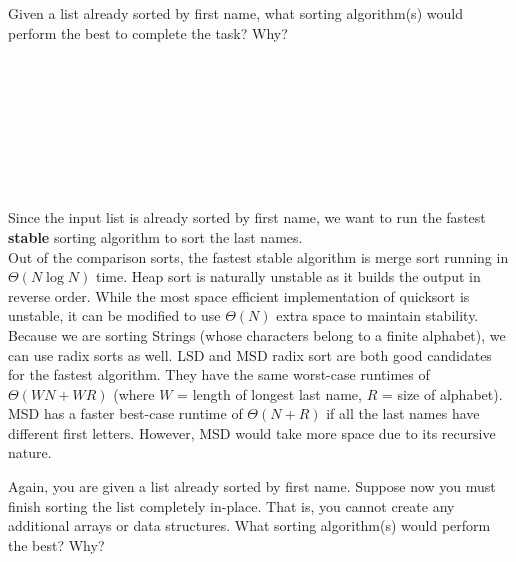 \begin{parts}
\item Given a list already sorted by first name, what sorting algorithm(s)
would perform the best to complete the task? Why? 

\ifprintanswers\else
\hspace \\ \\ \\ \\ \\ \\ \\
\fi 

\begin{solution}
Since the input list is already sorted by first name, we want to run the
fastest \textbf{stable} sorting algorithm to sort the last names.
\\
Out of the comparison sorts, the fastest stable algorithm is merge sort
running in $\Theta(N \log N)$ time. Heap sort is naturally unstable as it builds the output in reverse order. While the most space efficient implementation of quicksort is unstable, it can be modified to use $\Theta(N)$ extra space to maintain stability.
\\
Because we are sorting Strings (whose characters belong to a finite
alphabet), we can use radix sorts as well. LSD and MSD radix sort are
both good candidates for the fastest algorithm. They have the same
worst-case runtimes of $\Theta(W N + W R)$ (where $W$ = length of longest
last name, $R$ = size of alphabet). MSD has a faster best-case runtime
of $\Theta(N + R)$ if all the last names have different first letters. However,
MSD would take more space due to its recursive nature.
\end{solution}

\item Again, you are given a list already sorted by first name. Suppose now you must finish sorting the list completely in-place. That is, you cannot create any additional arrays or data structures. What sorting algorithm(s) would perform the best? Why? 

\ifprintanswers\else
\hpace \\ \\ \\ \\ \\ \\ \\
\fi 


\end{parts}
